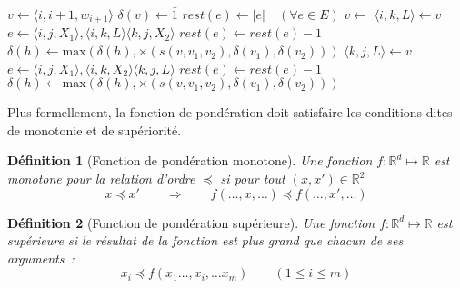 \documentclass[11pt,openany]{book}
\newtheorem{definition}{Définition}[chapter]
\begin{document}
\begin{algorithm}[htbp]
\begin{algorithmic}
\State $v \gets \langle i,i+1,w_{i+1} \rangle$
\State $\delta(v) \gets \bar{1}$
\State  {}
\EndFor
\State   $rest(e) \gets |e| \quad (\forall e \in E)$ 
\State $v \gets $ 
\State $\langle i , k , L \rangle \gets v$
\State $e \gets \langle i,j , X_1 \rangle , \langle i , k , L \rangle \langle k , j , X_2 \rangle$
\State $rest(e) \gets rest(e) - 1$
\State $\delta(h) \gets \text{max}( \delta(h),  \times(s(v,v_1,v_2),\delta(v_1),\delta(v_2)))$
\State {}
\EndIf
\EndFor
\EndFor
\State $\langle k , j , L \rangle \gets v$
\State $e \gets \langle i,j , X_1 \rangle , \langle i , k , X_2 \rangle \langle k , j , L \rangle$
\State $rest(e) \gets rest(e) - 1$
\State $\delta(h) \gets \text{max}( \delta(h),  \times(s(v,v_1,v_2),\delta(v_1),\delta(v_2)))$
\State {}
\EndIf
\EndFor
\EndFor
\EndWhile
\EndFunction
\end{algorithmic}
\caption{\label{algo-knuth-verbose} Algorithme de Knuth (version binaire)}
\end{algorithm}


Plus formellement, la fonction de pondération doit satisfaire les conditions dites de monotonie et de supériorité.
\begin{definition}[Fonction de pondération monotone]
Une fonction $f: \mathbb{R}^d \mapsto \mathbb{R}$ est monotone pour la relation d'ordre $\preceq$ si pour tout $(x,x') \in \mathbb{R}^2$ 
\begin{displaymath}
x \preceq x' \qquad \Rightarrow\qquad f(\ldots,x,\ldots) \preceq f(\ldots,x',\ldots)
\end{displaymath}
\end{definition}
\begin{definition}[Fonction de pondération supérieure]
Une fonction $f: \mathbb{R}^d \mapsto \mathbb{R}$ est supérieure si le résultat de la fonction
est plus grand que chacun de ses arguments~:
\begin{displaymath}
x_i \preceq f(x_1 \ldots,x_i,\ldots x_m) \qquad (1\leq i \leq m )
\end{displaymath}
\end{definition}
\end{document}
